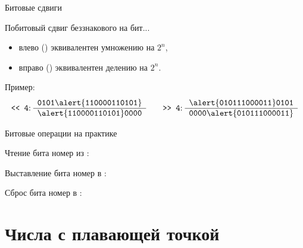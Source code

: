 \begin{frame}{Битовые сдвиги}

  Побитовый сдвиг беззнакового  на  бит...
  \begin{itemize}
    \item влево () эквивалентен умножению на $2^n$,
    \item вправо () эквивалентен делению на $2^n$.
  \end{itemize}

  \begin{block}{Пример:}
    \reduceBlockEqSpacing
    \begin{equation*}
      \text{\code{<{}< 4}:}\thickspace
      \begin{array}{r}
        \pcnum{0101 \alert{1100 0011 0101}} \\
        \hline
        \pcnum{\alert{1100 0011 0101} 0000} \\
      \end{array}
      \qquad
      \text{\code{>{}> 4}:}\thickspace
      \begin{array}{r}
        \pcnum{\alert{0101 1100 0011} 0101} \\
        \hline
        \pcnum{0000 \alert{0101 1100 0011}} \\
      \end{array}
    \end{equation*}
  \end{block}

\end{frame}

\begin{frame}{Битовые операции на практике}

  \begin{block}{Чтение бита номер  из :}
  \end{block}

  \begin{block}{Выставление бита номер  в :}
  \end{block}

  \begin{block}{Сброс бита номер  в :}
  \end{block}

\end{frame}

\section{Числа с плавающей точкой}



